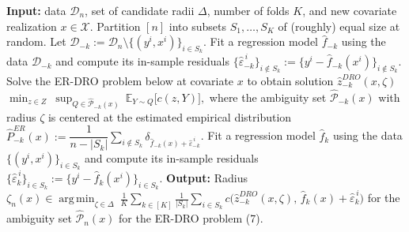 \documentclass[10pt,a4paper]{article}
\DeclareMathOperator*{\argmin}{arg\,min}
\DeclareMathOperator*{\argmin}{arg\,min}
\begin{document}
\begin{framed}
\begin{algorithm}[H] 
\caption{Specifying a covariate-dependent radius $\zeta_n(x)$ using the ER-DRO problem}
\begin{algorithmic}[1]
\State \textbf{Input:} data $\mathcal{D}_n$, set of candidate radii $\Delta$, number of folds $K$, and new covariate realization $x\in\mathcal{X}$.
\State Partition $[n]$ into subsets $S_1,\dots,S_K$ of (roughly) equal size at random. Let $\mathcal{D}_{-k}:=\mathcal{D}_n\setminus\{(y^i,x^i)\}_{i\in S_k}$.
  \For{$\zeta\in\Delta$}
    \State Fit a regression model $\hat f_{-k}$ using the data $\mathcal{D}_{-k}$ and compute its in-sample residuals $\{\hat\varepsilon^{\,i}_{-k}\}_{i\notin S_k}:=\{y^i-\hat f_{-k}(x^i)\}_{i\notin S_k}$.
    \State Solve the ER-DRO problem below at covariate $x$ to obtain solution $\hat z^{DRO}_{-k}(x,\zeta)$
    \Statex \hspace{\algorithmicindent}\hspace{\algorithmicindent}
      $\displaystyle \min_{z\in Z}\ \sup_{Q\in\hat{\mathcal{P}}_{-k}(x)}\ \mathbb{E}_{Y\sim Q}\big[c(z,Y)\big],$
    \Statex \hspace{\algorithmicindent}\hspace{\algorithmicindent}
      where the ambiguity set $\hat{\mathcal{P}}_{-k}(x)$ with radius $\zeta$ is centered at the estimated empirical distribution
      $\hat P^{ER}_{-k}(x):=\dfrac{1}{n-|S_k|}\displaystyle\sum_{i\notin S_k}\delta_{\hat f_{-k}(x)+\hat\varepsilon^{\,i}_{-k}}$.
    \State Fit a regression model $\hat f_k$ using the data $\{(y^i,x^i)\}_{i\in S_k}$ and compute its in-sample residuals $\{\hat\varepsilon^{\,i}_{k}\}_{i\in S_k}:=\{y^i-\hat f_k(x^i)\}_{i\in S_k}$.
  \EndFor
\EndFor
\State \textbf{Output:} Radius $\zeta_n(x)\in\displaystyle\argmin_{\zeta\in\Delta}\ \frac{1}{K}\sum_{k\in[K]}\frac{1}{|S_k|}\sum_{i\in S_k} c\big(\hat z^{DRO}_{-k}(x,\zeta),\,\hat f_k(x)+\hat\varepsilon^{\,i}_k\big)$ for the ambiguity set $\hat{\mathcal{P}}_n(x)$ for the ER-DRO problem (7).
\end{algorithmic}
\end{algorithm}
\end{framed}
\end{document}
